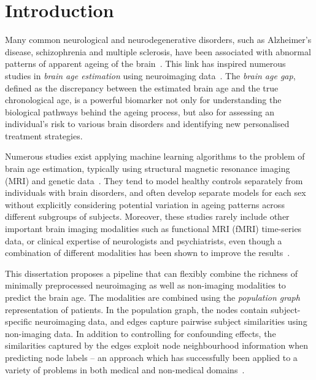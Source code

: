 \chapter{Introduction}



Many common neurological and neurodegenerative disorders, such as Alzheimer’s disease, schizophrenia and multiple sclerosis, have been associated with abnormal patterns of apparent ageing of the brain~\cite{kaufmann2019}. This link has inspired numerous studies in \textit{brain age estimation} using neuroimaging data~\cite{franke2019ten}. The \textit{brain age gap}, defined as the discrepancy between the estimated brain age and the true chronological age, is a powerful biomarker not only for understanding the biological pathways behind the ageing process, but also for assessing an individual’s risk to various brain disorders and identifying new personalised treatment strategies.


Numerous studies exist applying machine learning algorithms to the problem of brain age estimation, typically using structural magnetic resonance imaging (MRI) and genetic data~\cite{franke2019ten}. They tend to model healthy controls separately from individuals with brain disorders, and often develop separate models for each sex~\cite{kaufmann2019,niu2019improved} without explicitly considering potential variation in ageing patterns across different subgroups of subjects. Moreover, these studies rarely include other important brain imaging modalities such as functional MRI (fMRI) time-series data, or clinical expertise of neurologists and psychiatrists, even though a combination of different modalities has been shown to improve the results~\cite{niu2019improved}. 


This dissertation proposes a pipeline that can flexibly combine the richness of minimally preprocessed neuroimaging as well as non-imaging modalities to predict the brain age. The modalities are combined using the \textit{population graph} representation of patients. In the population graph, the nodes contain subject-specific neuroimaging data, and edges capture pairwise subject similarities using non-imaging data. In addition to controlling for confounding effects, the similarities captured by the edges exploit node neighbourhood information when predicting node labels – an approach which has successfully been applied to a variety of problems in both medical and non-medical domains~\cite{parisot2018disease}. 


